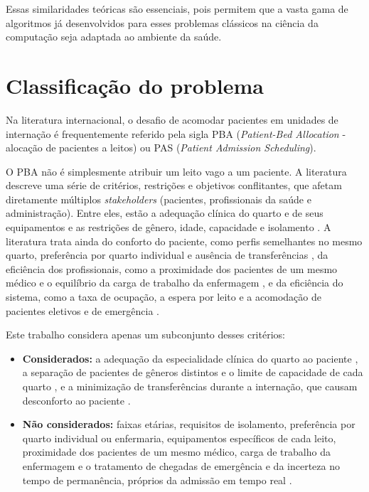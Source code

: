Essas similaridades teóricas são essenciais, pois permitem que a vasta gama de algoritmos já desenvolvidos para esses problemas clássicos na ciência da computação seja adaptada ao ambiente da saúde.

\section{Classificação do problema}

Na literatura internacional, o desafio de acomodar pacientes em unidades de internação é frequentemente referido pela sigla PBA (\textit{Patient-Bed Allocation} - alocação de pacientes a leitos) ou PAS (\textit{Patient Admission Scheduling}).

O PBA não é simplesmente atribuir um leito vago a um paciente. A literatura descreve uma série de critérios, restrições e objetivos conflitantes, que afetam diretamente múltiplos \textit{stakeholders} (pacientes, profissionais da saúde e administração). Entre eles, estão a adequação clínica do quarto e de seus equipamentos \cite{demeester2010hybrid, schafer2023combining} e as restrições de gênero, idade, capacidade e isolamento \cite{ceschia2012modeling, schafer2023combining}. A literatura trata ainda do conforto do paciente, como perfis semelhantes no mesmo quarto, preferência por quarto individual e ausência de transferências \cite{demeester2010hybrid}, da eficiência dos profissionais, como a proximidade dos pacientes de um mesmo médico e o equilíbrio da carga de trabalho da enfermagem \cite{schafer2023combining}, e da eficiência do sistema, como a taxa de ocupação, a espera por leito e a acomodação de pacientes eletivos e de emergência \cite{brandeau2004operations, belien2007building}.

Este trabalho considera apenas um subconjunto desses critérios:

\begin{itemize}
    \item \textbf{Considerados:} a adequação da especialidade clínica do quarto ao paciente \cite{demeester2010hybrid, schafer2023combining}, a separação de pacientes de gêneros distintos e o limite de capacidade de cada quarto \cite{ceschia2012modeling, schafer2023combining}, e a minimização de transferências durante a internação, que causam desconforto ao paciente \cite{demeester2010hybrid}.
    \item \textbf{Não considerados:} faixas etárias, requisitos de isolamento, preferência por quarto individual ou enfermaria, equipamentos específicos de cada leito, proximidade dos pacientes de um mesmo médico, carga de trabalho da enfermagem e o tratamento de chegadas de emergência e da incerteza no tempo de permanência, próprios da admissão em tempo real \cite{ceschia2012modeling, schafer2023combining}.
\end{itemize}

